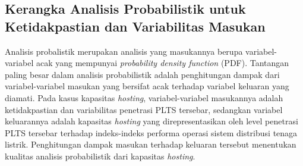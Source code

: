
\subsection{Kerangka Analisis Probabilistik untuk Ketidakpastian dan Variabilitas Masukan}
Analisis probalistik merupakan analisis yang masukannya berupa variabel-variabel acak yang mempunyai \textit{probability density function} (PDF)\cite{Dantzig2011}. Tantangan paling besar dalam analisis probabilistik adalah penghitungan dampak dari variabel-variabel masukan yang bersifat acak terhadap variabel keluaran yang diamati. Pada kasus kapasitas \textit{hosting}, variabel-variabel masukannya adalah ketidakpastian dan variabilitas penetrasi PLTS tersebar, sedangkan variabel keluarannya adalah kapasitas \textit{hosting} yang direpresentasikan oleh level penetrasi PLTS tersebar terhadap indeks-indeks performa operasi sistem distribusi tenaga listrik. Penghitungan dampak masukan terhadap keluaran tersebut menentukan kualitas analisis probabilistik dari kapasitas \textit{hosting}. 

